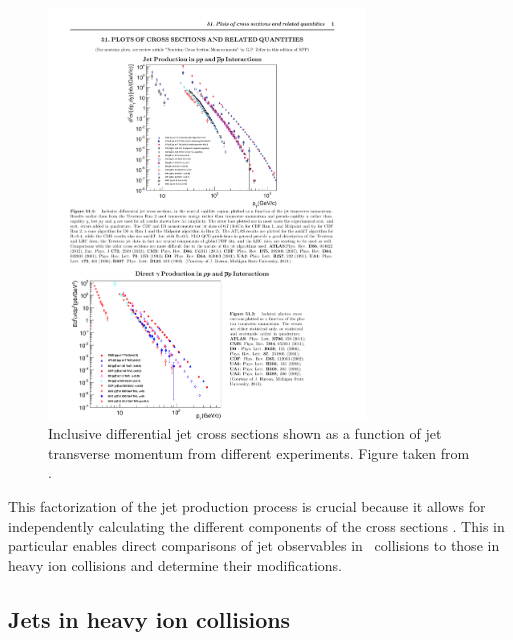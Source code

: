 \begin{figure}[htbp]
\begin{center}
\includegraphics[width=0.75\textwidth]{figures/theory/jetcs_pp}
\caption{Inclusive differential jet cross sections shown as a function of jet transverse momentum from different experiments.
Figure taken from \cite{Olive_2016}.}
\label{fig:jetcs_pp}
\end{center}
\end{figure}


This factorization of the jet production process is crucial because it allows for independently calculating the different components of the cross sections \cite{Majumder:2010qh}.
This in particular enables direct comparisons of jet observables in \pp\ collisions to those in heavy ion collisions and determine their modifications.

\subsection{Jets in heavy ion collisions}

